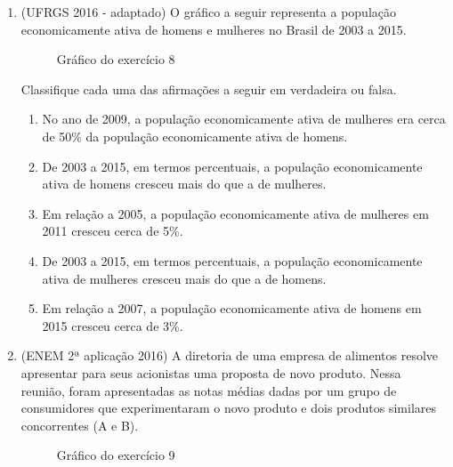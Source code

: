 \begin{enumerate}
\item (UFRGS 2016 - adaptado)  O gráfico a seguir representa a população economicamente ativa de homens e mulheres no Brasil de 2003 a 2015.

\begin{figure}[H]
\centering
\capstart

\noindent{}
\caption{Gráfico do exercício 8}\label{\detokenize{PE103-E:fig-coloque-aqui-o-nome}}\label{\detokenize{PE103-E:id18}}\end{figure}

Classifique cada uma das afirmações a seguir em verdadeira ou falsa.
\begin{enumerate}
\item {} 
No ano de 2009, a população economicamente ativa de mulheres era cerca de 50\% da população economicamente ativa de homens.

\item {} 
De 2003 a 2015, em termos percentuais, a população economicamente ativa de homens cresceu mais do que a de mulheres.

\item {} 
Em relação a 2005, a população economicamente ativa de mulheres em 2011 cresceu cerca de 5\%.

\item {} 
De 2003 a 2015, em termos percentuais, a população economicamente ativa de mulheres cresceu mais do que a de homens.

\item {} 
Em relação a 2007, a população economicamente ativa de homens em 2015 cresceu cerca de 3\%.

\end{enumerate}

\item (ENEM 2ª aplicação 2016)  A diretoria de uma empresa de alimentos resolve apresentar para seus acionistas uma proposta de novo produto. Nessa reunião, foram apresentadas as notas médias dadas por um grupo de consumidores que experimentaram o novo produto e dois produtos similares concorrentes (A e B).

\begin{figure}[H]
\centering
\capstart

\noindent{}
\caption{Gráfico do exercício 9}\label{\detokenize{PE103-E:id2}}\label{\detokenize{PE103-E:id19}}\end{figure}


\end{enumerate}
